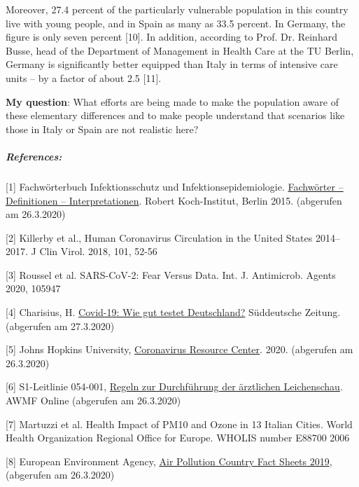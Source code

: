 Moreover, 27.4 percent of the particularly vulnerable population in this
country live with young people, and in Spain as many as 33.5 percent. In
Germany, the figure is only seven percent {[}10{]}. In addition,
according to Prof. Dr. Reinhard Busse, head of the Department of
Management in Health Care at the TU Berlin, Germany is significantly
better equipped than Italy in terms of intensive care units -- by a
factor of about 2.5 {[}11{]}.

\textbf{My question}: What efforts are being made to make the population
aware of these elementary differences and to make people understand that
scenarios like those in Italy or Spain are not realistic here?

\hypertarget{references}{%
\subparagraph{\texorpdfstring{\textbf{References:}}{References:}}\label{references}}

{[}1{]} Fachwörterbuch Infektionsschutz und Infektionsepidemiologie.
\href{https://www.rki.de/DE/Content/Service/Publikationen/Fachwoerterbuch_Infektionsschutz.html}{Fachwörter
-- Definitionen -- Interpretationen}. Robert Koch-Institut, Berlin 2015.
(abgerufen am 26.3.2020)

{[}2{]} Killerby et al., Human Coronavirus Circulation in the United
States 2014--2017. J Clin Virol. 2018, 101, 52-56

{[}3{]} Roussel et al. SARS-CoV-2: Fear Versus Data. Int. J. Antimicrob.
Agents 2020, 105947

{[}4{]} Charisius, H.
\href{https://www.sueddeutsche.de/gesundheit/covid-19-coronavirus-testverfahren-1.4855487}{Covid-19:
Wie gut testet Deutschland?} Süddeutsche Zeitung. (abgerufen am
27.3.2020)

{[}5{]} Johns Hopkins University,
\href{https://coronavirus.jhu.edu/map.html}{Coronavirus Resource
Center}. 2020. (abgerufen am 26.3.2020)

{[}6{]} S1-Leitlinie 054-001,
\href{https://www.awmf.org/uploads/tx_szleitlinien/054-002l_S1_Regeln-zur-Durchfuehrung-der-aerztlichen-Leichenschau_2018-02_01.pdf}{Regeln
zur Durchführung der ärztlichen Leichenschau}. AWMF Online (abgerufen am
26.3.2020)

{[}7{]} Martuzzi et al. Health Impact of PM10 and Ozone in 13 Italian
Cities. World Health Organization Regional Office for Europe. WHOLIS
number E88700 2006

{[}8{]} European Environment Agency,
\href{https://www.eea.europa.eu/themes/air/country-fact-sheets/2019-country-fact-sheets}{Air
Pollution Country Fact Sheets 2019}, (abgerufen am 26.3.2020)

